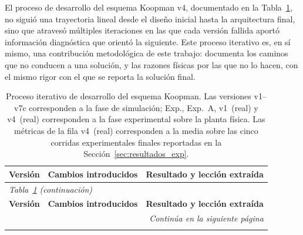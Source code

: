 \documentclass[12pt,letterpaper]{article}
\begin{document}
El proceso de desarrollo del esquema Koopman v4, documentado en 
la Tabla~\ref{tab:versiones_koopman}, no siguió una trayectoria 
lineal desde el diseño inicial hasta la arquitectura final, sino 
que atravesó múltiples iteraciones en las que cada versión 
fallida aportó información diagnóstica que orientó la siguiente. 
Este proceso iterativo es, en sí mismo, una contribución 
metodológica de este trabajo: documenta los caminos que no
conducen a una solución, y las razones físicas por las que no
lo hacen, con el mismo rigor con el que se reporta la solución
final.

\small
\setlength{\tabcolsep}{4pt}
\begin{longtable}{p{1.8cm} p{7.0cm} p{6.5cm}}
\caption{Proceso iterativo de desarrollo del esquema Koopman.
Las versiones v1--v7c corresponden a la fase de simulación;
Exp., Exp.~A, v1~(real) y v4~(real) corresponden a la fase
experimental sobre la planta física. Las métricas de la fila
v4~(real) corresponden a la media sobre las cinco corridas
experimentales finales reportadas en la
Sección~\ref{sec:resultados_exp}.}
\label{tab:versiones_koopman} \\
\toprule
\textbf{Versión} & \textbf{Cambios introducidos} &
\textbf{Resultado y lección extraída} \\
\midrule
\endfirsthead

\multicolumn{3}{l}{\small\textit{Tabla~\ref{tab:versiones_koopman} (continuación)}} \\
\toprule
\textbf{Versión} & \textbf{Cambios introducidos} &
\textbf{Resultado y lección extraída} \\
\midrule
\endhead

\midrule
\multicolumn{3}{r}{\small\textit{Continúa en la siguiente página}} \\
\endfoot

\bottomrule
\endlastfoot


\end{longtable}
\end{document}

